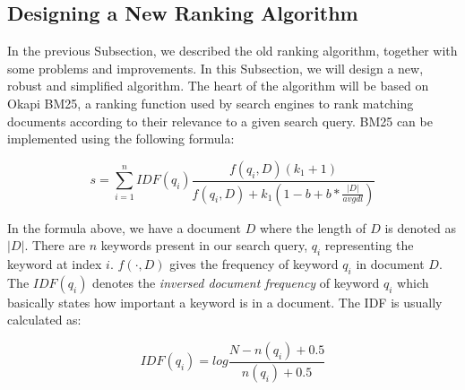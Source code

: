 \subsection{Designing a New Ranking Algorithm}
In the previous Subsection, we described the old ranking algorithm, together with some problems and improvements. In this Subsection, we will design a new, robust and simplified algorithm. The heart of the algorithm will be based on Okapi BM25, a ranking function used by search engines to rank matching documents according to their relevance to a given search query\cite{jones2000probabilistic}. BM25 can be implemented using the following formula:

\begin{equation}
\label{eq:bm25}
s = \sum_{i=1}^{n} IDF(q_i) \frac{f(q_i, D)(k_1 + 1)}{f(q_i, D) + k_1 (1 - b + b * \frac{|D|}{avgdl})}
\end{equation}

In the formula above, we have a document $ D $ where the length of $ D $ is denoted as $ |D| $. There are $ n $ keywords present in our search query, $ q_i $ representing the keyword at index $ i $. $ f(\cdot, D) $ gives the frequency of keyword $ q_i $ in document $ D $. The $ IDF(q_i) $ denotes the \emph{inversed document frequency} of keyword $ q_i $ which basically states how important a keyword is in a document. The IDF is usually calculated as:

\begin{equation}
\label{eq:bm25-idf}
IDF(q_i) = log\frac{N - n(q_i) + 0.5}{n(q_i) + 0.5}
\end{equation}


